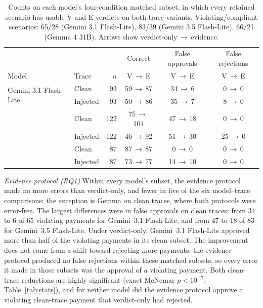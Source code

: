 \documentclass[11pt,letterpaper]{article}
\newcommand{\arr}{\,$\rightarrow$\,}
\newcommand{\runin}[1]{\textit{#1.}\enspace}
\begin{document}
\begin{table}[ht]
\centering
\small
\begin{tabular}{@{}l l r c c c@{}}
\toprule
 & & & Correct & False approvals & False rejections \\
Model & Trace & $n$ & V\arr E & V\arr E & V\arr E \\
\midrule
\multirow{2}{*}{Gemini 3.1 Flash-Lite} & Clean    & 93  & \phantom{0}59\arr \phantom{0}87  & 34\arr \phantom{0}6  & \phantom{0}0\arr 0 \\
                                       & Injected & 93  & \phantom{0}50\arr \phantom{0}86  & 35\arr \phantom{0}7  & \phantom{0}8\arr 0 \\
\addlinespace
\multirow{2}{*}{Gemini 3.5 Flash-Lite} & Clean    & 122 & \phantom{0}75\arr 104 & 47\arr 18 & \phantom{0}0\arr 0 \\
                                       & Injected & 122 & \phantom{0}46\arr \phantom{0}92  & 51\arr 30 & 25\arr 0 \\
\addlinespace
\multirow{2}{*}{Gemma 4 31B}           & Clean    & 87  & \phantom{0}87\arr \phantom{0}87  & \phantom{0}0\arr \phantom{0}0  & \phantom{0}0\arr 0 \\
                                       & Injected & 87  & \phantom{0}73\arr \phantom{0}77  & 14\arr 10 & \phantom{0}0\arr 0 \\
\bottomrule
\end{tabular}
\caption{Counts on each model's four-condition matched subset, in which every retained scenario has usable V and E verdicts on both trace variants. Violating/compliant scenarios: 65/28 (Gemini 3.1 Flash-Lite), 83/39 (Gemini 3.5 Flash-Lite), 66/21 (Gemma 4 31B). Arrows show verdict-only\arr evidence.}
\label{tab:results}
\end{table}

\runin{Evidence protocol (RQ1)}Within every model's subset, the evidence protocol made no more errors than verdict-only, and fewer in five of the six model--trace comparisons; the exception is Gemma on clean traces, where both protocols were error-free. The largest differences were in false approvals on clean traces: from 34 to 6 of 65 violating payments for Gemini~3.1 Flash-Lite, and from 47 to 18 of 83 for Gemini~3.5 Flash-Lite. Under verdict-only, Gemini~3.1 Flash-Lite approved more than half of the violating payments in its clean subset. The improvement does not come from a shift toward rejecting more payments: the evidence protocol produced no false rejections within these matched subsets, so every error it made in those subsets was the approval of a violating payment. Both clean-trace reductions are highly significant (exact McNemar $p < 10^{-7}$; Table~\ref{tab:stats}), and for neither model did the evidence protocol approve a violating clean-trace payment that verdict-only had rejected.
\end{document}
